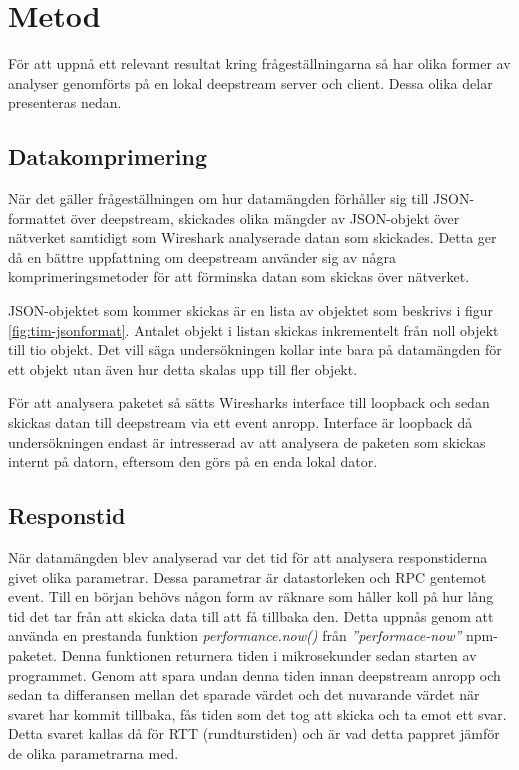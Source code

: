 \section{Metod}
\label{sec:tim-method}
För att uppnå ett relevant resultat kring frågeställningarna så har olika former av analyser genomförts på en lokal deepstream server och client. Dessa olika delar presenteras nedan.

\subsection{Datakomprimering}
När det gäller frågeställningen om hur datamängden förhåller sig till JSON-formattet över deepstream, skickades olika mängder av JSON-objekt över nätverket samtidigt som Wireshark analyserade datan som skickades. Detta ger då en bättre uppfattning om deepstream använder sig av några komprimeringsmetoder för att förminska datan som skickas över nätverket.

JSON-objektet som kommer skickas är en lista av objektet som beskrivs i figur \ref{fig:tim-jsonformat}. Antalet objekt i listan skickas inkrementelt från noll objekt till tio objekt. Det vill säga undersökningen kollar inte bara på datamängden för ett objekt utan även hur detta skalas upp till fler objekt. 

För att analysera paketet så sätts Wiresharks interface till loopback och sedan skickas datan till deepstream via ett event anropp. Interface är loopback då undersökningen endast är intresserad av att analysera de paketen som skickas internt på datorn, eftersom den görs på en enda lokal dator.


\subsection{Responstid}
När datamängden blev analyserad var det tid för att analysera responstiderna givet olika parametrar. Dessa parametrar är datastorleken och RPC gentemot event. Till en början behövs någon form av räknare som håller koll på hur lång tid det tar från att skicka data till att få tillbaka den. Detta uppnås genom att använda en prestanda funktion \textit{performance.now()} från \textit{''performace-now''}\cite{performance-now} npm-paketet. Denna funktionen returnera tiden i mikrosekunder sedan starten av programmet. Genom att spara undan denna tiden innan deepstream anropp och sedan ta differansen mellan det sparade värdet och det nuvarande värdet när svaret har kommit tillbaka, fås tiden som det tog att skicka och ta emot ett svar. Detta svaret kallas då för RTT (rundturstiden) och är vad detta pappret jämför de olika parametrarna med. 

